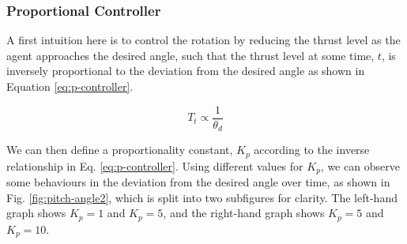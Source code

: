 \documentclass[12pt]{article}
\begin{document}
\subsubsection{Proportional Controller}
A first intuition here is to control the rotation by reducing the thrust level as the agent approaches the desired angle, such that the thrust level at some time, $t$, is inversely proportional to the deviation from the desired angle as shown in Equation \ref{eq:p-controller}.

\begin{equation}
    T_t \propto \frac{1}{\theta_d}
    \label{eq:p-controller}
\end{equation}

We can then define a proportionality constant, $K_p$ according to the inverse relationship in Eq. \ref{eq:p-controller}. Using different values for $K_p$, we can observe some behaviours in the deviation from the desired angle over time, as shown in Fig. \ref{fig:pitch-angle2}, which is split into two subfigures for clarity. The left-hand graph shows $K_p = 1$ and $K_p = 5$, and the right-hand graph shows $K_p = 5$ and $K_p = 10$.
\end{document}
